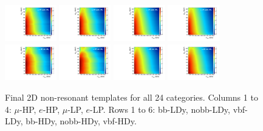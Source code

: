 \begin{figure}[htbp]
  \includegraphics[width=0.2\textwidth]{fig/2Dfit/template_nonRes_mu_HP_nobb_HDy.pdf}
  \includegraphics[width=0.2\textwidth]{fig/2Dfit/template_nonRes_e_HP_nobb_HDy.pdf}
  \includegraphics[width=0.2\textwidth]{fig/2Dfit/template_nonRes_mu_LP_nobb_HDy.pdf}
  \includegraphics[width=0.2\textwidth]{fig/2Dfit/template_nonRes_e_LP_nobb_HDy.pdf}\\
  \includegraphics[width=0.2\textwidth]{fig/2Dfit/template_nonRes_mu_HP_vbf_HDy.pdf}
  \includegraphics[width=0.2\textwidth]{fig/2Dfit/template_nonRes_e_HP_vbf_HDy.pdf}
  \includegraphics[width=0.2\textwidth]{fig/2Dfit/template_nonRes_mu_LP_vbf_HDy.pdf}
  \includegraphics[width=0.2\textwidth]{fig/2Dfit/template_nonRes_e_LP_vbf_HDy.pdf}\\
  \caption{
    Final 2D non-resonant templates for all 24 categories.
    Columns 1 to 4: $\mu$-HP, $e$-HP, $\mu$-LP, $e$-LP.
    Rows 1 to 6: bb-LDy, nobb-LDy, vbf-LDy, bb-HDy, nobb-HDy, vbf-HDy.
  }
  \label{fig:templates_nonRes_Run2}
\end{figure}

